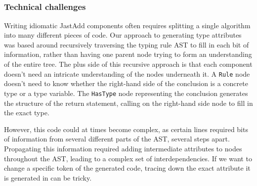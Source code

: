 \documentclass[nofilelist]{cslthse-msc}
\newcommand{\CR}[1]{\textcolor{green!60!black}{[\textbf{CR}:#1]}}
\begin{document}

\subsection{\rqthree}

\subsubsection{Technical challenges}
Writing idiomatic JastAdd components often requires splitting a single algorithm into many different pieces of code.
Our approach to generating type attributes was based around recursively traversing the typing rule AST to fill in each bit of information, rather than having one parent node trying to form an understanding of the entire tree.
The plus side of this recursive approach is that each component doesn't need an intricate understanding of the nodes underneath it.
A \lstinline{Rule} node doesn't need to know whether the right-hand side of the conclusion is a concrete type or a type variable.
The \lstinline{HasType} node representing the conclusion generates the structure of the return statement, calling on the right-hand side node to fill in the exact type.

However, this code could at times become complex, as certain lines required bits of information from several different parts of the AST, several steps apart.
Propagating this information required adding intermediate attributes to nodes throughout the AST, leading to a complex set of interdependencies.
If we want to change a specific token of the generated code, tracing down the exact attribute it is generated in can be tricky.

\end{document}
